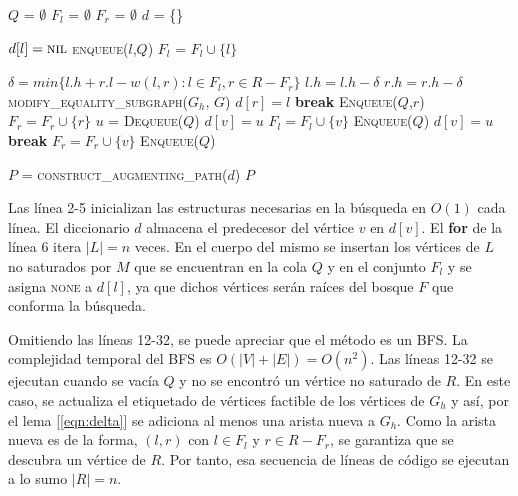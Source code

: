 \documentclass[10pt]{article} %
\begin{document}
\vspace{1em}
\begin{algorithmic}[1]
	\State $Q$ = $\emptyset$
	\State $F_l$ = $\emptyset$
	\State $F_r$ = $\emptyset$
	\State $d$ = \{\}
	
	\State $d[l] = \textsc{nil}$
	\State \textsc{enqueue($l$,$Q$)}
	\State $F_l$ = $F_l \cup \{l\}$
	
	\EndFor
	
	\Repeat
	\State $\delta = min\{l.h + r.l - w(l,r): l\in F_l, r \in R-F_r\}$ 
	\State $l.h = l.h -\delta$
	\EndFor
	\State $r.h = r.h -\delta$
	\EndFor
	\State \textsc{modify\_equality\_subgraph($G_h$, $G$)}
	\State $d[r] = l $
	\State \textbf{break}
	\Else
	\State \textsc{Enqueue($Q$,$r$)}
	\State $F_r = F_r \cup \{r\}$
	\EndIf
	\EndIf
	\EndFor
	\EndIf
	\State $u$ = \textsc{Dequeue($Q$)}
	\State $d[v] = u$
	\State $F_l = F_l \cup \{v\}$
	\State \textsc{Enqueue($Q$)}
	\EndIf
	\EndFor	
	\Else 
	\State $d[v] = u$
	\State \textbf{break}
	\Else						
	\State $F_r = F_r \cup \{v\}$
	\State \textsc{Enqueue($Q$)}
	\EndIf
	\EndIf
	
	\EndFor	
	
	\EndIf
	
	\State $P$ = \textsc{construct\_augmenting\_path($d$)}
	\State \Return $P$
	\EndFunction 
\end{algorithmic}
\vspace{1em}

Las l\'inea 2-5 inicializan las estructuras necesarias en la b\'usqueda en $O(1)$ cada l\'inea. El diccionario $d$ almacena el predecesor del v\'ertice $v$ en $d[v]$. El \textbf{for} de la l\'inea 6 itera $|L|=n$ veces. En el cuerpo del mismo se insertan los v\'ertices de $L$ no saturados por $M$ que se encuentran en la cola $Q$ y en el conjunto $F_l$ y se asigna \textsc{none} a $d[l]$, ya que dichos v\'ertices ser\'an ra\'ices del bosque $F$ que conforma la b\'usqueda.

Omitiendo las l\'ineas 12-32, se puede apreciar que el m\'etodo es un BFS. La complejidad temporal del BFS es $O(|V| + |E|) = O(n^2)$. Las l\'ineas 12-32 se ejecutan cuando se vac\'ia $Q$ y no se encontr\'o un v\'ertice no saturado de $R$. En este caso, se actualiza el etiquetado de v\'ertices factible de los v\'ertices de $G_h$ y as\'i, por el lema [\ref{eqn:delta}] se adiciona al menos una arista nueva a $G_h$. Como la arista nueva es de la forma, $(l,r)$ con $l\in F_l$ y $r \in R-F_r$, se garantiza que se descubra un v\'ertice de $R$. Por tanto, esa secuencia de l\'ineas de c\'odigo se ejecutan a lo sumo $|R|=n$.
\end{document}
